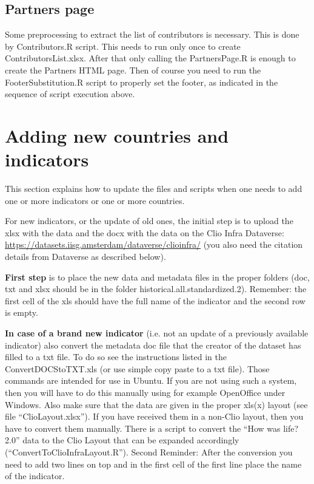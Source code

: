 \documentclass[a4paper]{article}
\begin{document}
\subsection{Partners page}

Some preprocessing to extract the list of contributors is necessary. This is 
done by Contributors.R script. This needs to run only once to create 
ContributorsList.xlsx. After that only calling the PartnersPage.R is enough to 
create the Partners HTML page. Then of course you need to run the 
FooterSubstitution.R script to properly set the footer, as indicated in the 
sequence of script execution above.

\section{Adding new countries and indicators}

This section explains how to update the files and scripts when one needs to add 
one or more indicators or one or more countries.

For new indicators, or the update of old ones, the initial step is to upload the xlsx with the data and the docx with the data on the Clio Infra Dataverse: \url{https://datasets.iisg.amsterdam/dataverse/clioinfra/} (you also need the citation details from Dataverse as described below).

\textbf{First step} is to place the new data and metadata files in the proper folders (doc, txt and xlsx should be in the folder historical.all.standardized.2). Remember: the first cell of the xls should have the full name of the indicator and the second row is empty.

\textbf{In case of a brand new indicator} (i.e. not an update of a previously available indicator) also convert the metadata doc file that the creator of the dataset has filled to a txt file. To do so see the instructions listed in the ConvertDOCStoTXT.xls (or use simple copy paste to a txt file). Those commands are intended for use in Ubuntu. If you are not using such a system, then you will have to do this manually using for example OpenOffice under Windows. Also make sure that the data are given in the proper xls(x) layout (see file ``ClioLayout.xlsx''). If you have received them in a non-Clio layout, then you have to convert them manually. There is a script to convert the ``How was life? 2.0'' data to the Clio Layout that can be expanded accordingly (``ConvertToClioInfraLayout.R''). Second Reminder: After the conversion you need to add two lines on top and in the first cell of the first line place the name of the indicator.
\end{document}
